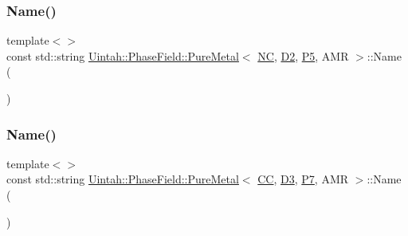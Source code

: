\subsubsection{\texorpdfstring{Name()}{Name()}\hspace{0.1cm}{\footnotesize\ttfamily [6/8]}}
{\footnotesize\ttfamily template$<$$>$ \\
const std\+::string \hyperlink{classUintah_1_1PhaseField_1_1PureMetal}{Uintah\+::\+Phase\+Field\+::\+Pure\+Metal}$<$ \hyperlink{namespaceUintah_1_1PhaseField_a33d355affda78a83f45755ba8388cedda77924170fe82bfd58b74ca3e44139718}{NC}, \hyperlink{namespaceUintah_1_1PhaseField_a12bfc68444894dffdf0cb8d9cf0cc76aa1a451dae278b0103a94105c8776e9a67}{D2}, \hyperlink{namespaceUintah_1_1PhaseField_a24d833a720598df1020f5cc2e75f8702a218e7fca21085b602c79158a04bc83a0}{P5}, A\+MR $>$\+::Name (\begin{DoxyParamCaption}{ }\end{DoxyParamCaption})}

\mbox{\label{classUintah_1_1PhaseField_1_1PureMetal_a6264dabd374ea7e11d9794861f359b62}} 
\subsubsection{\texorpdfstring{Name()}{Name()}\hspace{0.1cm}{\footnotesize\ttfamily [7/8]}}
{\footnotesize\ttfamily template$<$$>$ \\
const std\+::string \hyperlink{classUintah_1_1PhaseField_1_1PureMetal}{Uintah\+::\+Phase\+Field\+::\+Pure\+Metal}$<$ \hyperlink{namespaceUintah_1_1PhaseField_a33d355affda78a83f45755ba8388cedda22303704507d024d1d6508ed9859a85a}{CC}, \hyperlink{namespaceUintah_1_1PhaseField_a12bfc68444894dffdf0cb8d9cf0cc76aa72fd61934c7ca788c49ad90629f76e78}{D3}, \hyperlink{namespaceUintah_1_1PhaseField_a24d833a720598df1020f5cc2e75f8702a099a5b9a00f5644bb917fdec6afd8768}{P7}, A\+MR $>$\+::Name (\begin{DoxyParamCaption}{ }\end{DoxyParamCaption})}

\mbox{\label{classUintah_1_1PhaseField_1_1PureMetal_a4b87c88ceb27d8c139354a2867a39d9e}} 
